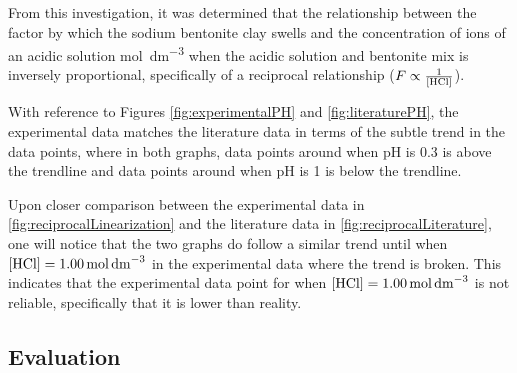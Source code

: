 \documentclass[11pt, letterpaper]{article}
\begin{document}
From this investigation, it was determined that the relationship
between the factor by which the sodium bentonite clay swells
and the concentration of  ions of an acidic solution \unit{mol.dm^{-3}}
when the acidic solution and bentonite mix is inversely proportional, specifically
of a reciprocal relationship (\(F \propto \frac{1}{\ce{[HCl]}}\)).

With reference to Figures \ref*{fig:experimentalPH} and \ref*{fig:literaturePH},
the experimental data matches the literature data in terms of
the subtle trend in the data points, where in both graphs,
data points around when pH is 0.3 is above the trendline
and data points around when pH is 1 is below the trendline.

Upon closer comparison between the experimental data in \ref*{fig:reciprocalLinearization}
and the literature data in \ref*{fig:reciprocalLiterature},
one will notice that the two graphs do follow a similar trend
until when \(\ce{[HCl]} = \SI{1.00}{mol.dm^{-3}}\) in the
experimental data where the trend is broken. This indicates
that the experimental data point for when \(\ce{[HCl]} = \SI{1.00}{mol.dm^{-3}}\)
is not reliable, specifically that it is lower than reality.

\subsection{Evaluation}
\end{document}
